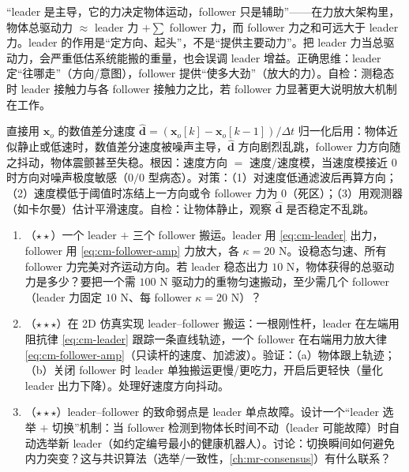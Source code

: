 \begin{pitfall}
“leader 是主导，它的力决定物体运动，follower 只是辅助”——在力放大架构里，物体总驱动力 $\approx$ leader 力 $+\sum$ follower 力，而 follower 力之和可远大于 leader 力。leader 的作用是“定方向、起头”，不是“提供主要动力”。把 leader 力当总驱动力，会严重低估系统能搬的重量，也会误调 leader 增益。正确思维：leader 定“往哪走”（方向/意图），follower 提供“使多大劲”（放大的力）。自检：测稳态时 leader 接触力与各 follower 接触力之比，若 follower 力显著更大说明放大机制在工作。
\end{pitfall}

\begin{pitfall}
直接用 $\mathbf{x}_o$ 的数值差分速度 $\hat{\mathbf{d}}=(\mathbf{x}_o[k]-\mathbf{x}_o[k-1])/\Delta t$ 归一化后用：物体近似静止或低速时，数值差分速度被噪声主导，$\hat{\mathbf{d}}$ 方向剧烈乱跳，follower 力方向随之抖动，物体震颤甚至失稳。根因：速度方向 $=$ 速度/速度模，当速度模接近 $0$ 时方向对噪声极度敏感（$0/0$ 型病态）。对策：（1）对速度低通滤波后再算方向；（2）速度模低于阈值时冻结上一方向或令 follower 力为 $0$（死区）；（3）用观测器（如卡尔曼）估计平滑速度。自检：让物体静止，观察 $\hat{\mathbf{d}}$ 是否稳定不乱跳。
\end{pitfall}

\begin{practice}
\begin{enumerate}
  \item （$\star\star$）一个 leader $+$ 三个 follower 搬运。leader 用 \cref{eq:cm-leader} 出力，follower 用 \cref{eq:cm-follower-amp} 力放大，各 $\kappa=20$ N。设稳态匀速、所有 follower 力完美对齐运动方向。若 leader 稳态出力 $10$ N，物体获得的总驱动力是多少？要把一个需 $100$ N 驱动力的重物匀速搬动，至少需几个 follower（leader 力固定 $10$ N、每 follower $\kappa=20$ N）？
  \item （$\star\star\star$）在 2D 仿真实现 leader--follower 搬运：一根刚性杆，leader 在左端用阻抗律 \cref{eq:cm-leader} 跟踪一条直线轨迹，一个 follower 在右端用力放大律 \cref{eq:cm-follower-amp}（只读杆的速度、加滤波）。验证：（a）物体跟上轨迹；（b）关闭 follower 时 leader 单独搬运更慢/更吃力，开启后更轻快（量化 leader 出力下降）。处理好速度方向抖动。
  \item （$\star\star\star$）leader--follower 的致命弱点是 leader 单点故障。设计一个“leader 选举 $+$ 切换”机制：当 follower 检测到物体长时间不动（leader 可能故障）时自动选举新 leader（如约定编号最小的健康机器人）。讨论：切换瞬间如何避免内力突变？这与共识算法（选举/一致性，\cref{ch:mr-consensus}）有什么联系？
\end{enumerate}
\end{practice}

